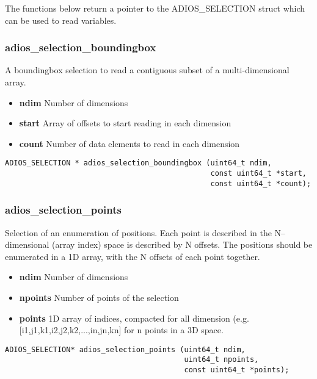 The functions below return a pointer to the ADIOS\_SELECTION struct which can be used to read variables.
 

\subsubsection{adios\_selection\_boundingbox}
A boundingbox selection to read a contiguous subset of a multi-dimensional array.

\begin{itemize} 
\item{\bf ndim}      Number of dimensions
\item{\bf start}     Array of offsets to start reading in each dimension
\item{\bf count}     Number of data elements to read in each dimension
\end{itemize}

\begin{lstlisting}[alsolanguage=C]
ADIOS_SELECTION * adios_selection_boundingbox (uint64_t ndim, 
                                               const uint64_t *start, 
                                               const uint64_t *count);
\end{lstlisting}


\subsubsection{adios\_selection\_points}
Selection of an enumeration of positions.
Each point is described in the N--dimensional (array index) space is 
described by N offsets. The positions should be enumerated in a 1D array,
with the N offsets of each point together.

\begin{itemize} 
\item{\bf ndim}      Number of dimensions
\item{\bf npoints}   Number of points of the selection
\item{\bf points}    1D array of indices, compacted for all dimension
(e.g.  [i1,j1,k1,i2,j2,k2,...,in,jn,kn] for n points in a 3D space.
\end{itemize}

\begin{lstlisting}[alsolanguage=C]
ADIOS_SELECTION* adios_selection_points (uint64_t ndim, 
                                         uint64_t npoints, 
                                         const uint64_t *points);
\end{lstlisting}


